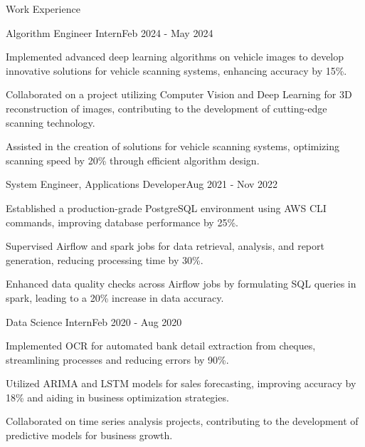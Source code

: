 \documentclass{resume} %
\begin{document}
    \begin{rSection}{Work Experience}
                    \begin{rSubsection}
                {Algorithm Engineer Intern}{Feb 2024 - May 2024}
                                    {}
                                {}
                                    \item Implemented advanced deep learning algorithms on vehicle images to develop innovative solutions for vehicle scanning systems, enhancing accuracy by 15\%.
                                    \item Collaborated on a project utilizing Computer Vision and Deep Learning for 3D reconstruction of images, contributing to the development of cutting{-}edge scanning technology.
                                    \item Assisted in the creation of solutions for vehicle scanning systems, optimizing scanning speed by 20\% through efficient algorithm design.
                            \end{rSubsection}
                    \begin{rSubsection}
                {System Engineer, Applications Developer}{Aug 2021 - Nov 2022}
                                    {}
                                {}
                                    \item Established a production{-}grade PostgreSQL environment using AWS CLI commands, improving database performance by 25\%.
                                    \item Supervised Airflow and spark jobs for data retrieval, analysis, and report generation, reducing processing time by 30\%.
                                    \item Enhanced data quality checks across Airflow jobs by formulating SQL queries in spark, leading to a 20\% increase in data accuracy.
                            \end{rSubsection}
                    \begin{rSubsection}
                {Data Science Intern}{Feb 2020 - Aug 2020}
                                    {}
                                {}
                                    \item Implemented OCR for automated bank detail extraction from cheques, streamlining processes and reducing errors by 90\%.
                                    \item Utilized ARIMA and LSTM models for sales forecasting, improving accuracy by 18\% and aiding in business optimization strategies.
                                    \item Collaborated on time series analysis projects, contributing to the development of predictive models for business growth.
                            \end{rSubsection}
            \end{rSection}
\end{document}
